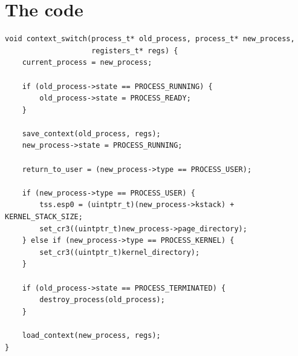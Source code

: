 \begin{center}
\end{center}

\section{The code}

\begin{lstlisting}[style=c]
void context_switch(process_t* old_process, process_t* new_process,
                    registers_t* regs) {
    current_process = new_process;

    if (old_process->state == PROCESS_RUNNING) {
        old_process->state = PROCESS_READY;
    }

    save_context(old_process, regs);
    new_process->state = PROCESS_RUNNING;

    return_to_user = (new_process->type == PROCESS_USER);

    if (new_process->type == PROCESS_USER) {
        tss.esp0 = (uintptr_t)(new_process->kstack) + KERNEL_STACK_SIZE;
        set_cr3((uintptr_t)new_process->page_directory);
    } else if (new_process->type == PROCESS_KERNEL) {
        set_cr3((uintptr_t)kernel_directory);
    }

    if (old_process->state == PROCESS_TERMINATED) {
        destroy_process(old_process);
    }

    load_context(new_process, regs);
}
\end{lstlisting}

